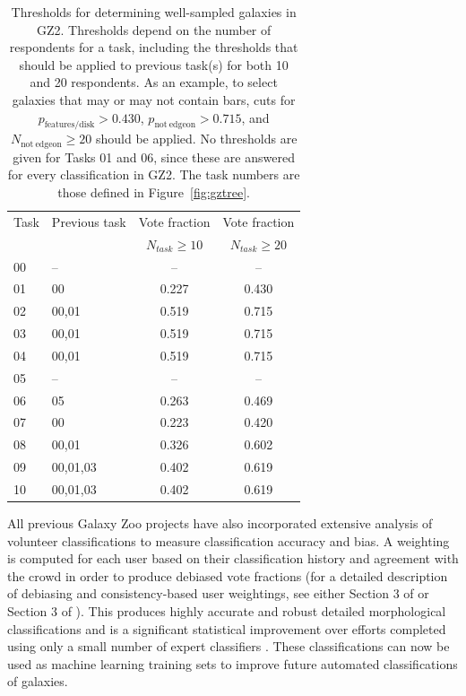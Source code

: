 \begin{table}
\centering
 \begin{tabular*}{\textwidth}{l@{\extracolsep{\fill}}lcc}
 \hline
\multicolumn{1}{l}{Task} &
\multicolumn{1}{l}{Previous task} &
\multicolumn{1}{c}{Vote fraction} &
\multicolumn{1}{c}{Vote fraction}
\\ 
\multicolumn{1}{l}{} &
\multicolumn{1}{l}{} &
\multicolumn{1}{c}{$N_{task}\geq10$} &
\multicolumn{1}{c}{$N_{task}\geq20$}
\\ 
\hline					
00                      & --        & --        & --        \\
01                      & 00        & 0.227     & 0.430     \\
02                      & 00,01     & 0.519     & 0.715     \\
03                      & 00,01     & 0.519     & 0.715     \\
04                      & 00,01     & 0.519     & 0.715     \\
05                      & --        & --        & --        \\
06                      & 05        & 0.263     & 0.469     \\
07                      & 00        & 0.223     & 0.420     \\
08                      & 00,01     & 0.326     & 0.602     \\
09                      & 00,01,03  & 0.402     & 0.619     \\
10                      & 00,01,03  & 0.402     & 0.619     \\
\hline
\end{tabular*}
\caption[Thresholds for selecting sub-samples of galaxies using GZ2 data]{Thresholds for determining well-sampled galaxies in GZ2. Thresholds depend on the number of respondents for a task, including the thresholds that should be applied to previous task(s) for both 10 and 20 respondents. As an example, to select galaxies that may or may not contain bars, cuts for $p_\mathrm{features/disk}>0.430$, $p_\mathrm{not~edgeon}>0.715$, and $N_\mathrm{not~edgeon}\geq20$ should be applied. No thresholds are given for Tasks 01 and 06, since these are answered for every classification in GZ2. The task numbers are those defined in Figure~\ref{fig:gztree}.}
\label{table:votes}
\end{table}

All previous Galaxy Zoo projects have also incorporated extensive analysis of volunteer classifications to measure classification accuracy and bias. A weighting is computed for each user based on their classification history and agreement with the crowd in order to produce debiased vote fractions (for a detailed description of debiasing and consistency-based user weightings, see either Section 3 of \citealt{Lintott09} or Section 3 of \citealt{GZ2}). This produces highly accurate and robust detailed morphological classifications and is a significant statistical improvement over efforts completed using only a small number of expert classifiers \citep{schawinski07, nair10b, ann15}. These classifications can now be used as machine learning training sets \citep{dieleman15} to improve future automated classifications of galaxies. 


